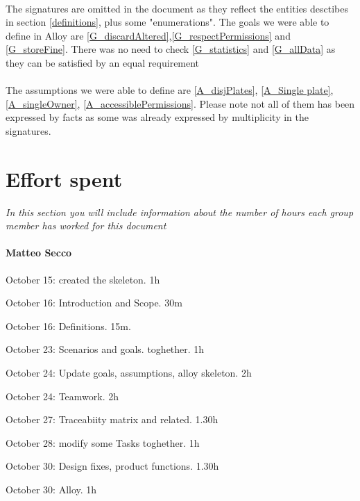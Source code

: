 \documentclass{article}
\begin{document}
	\paragraph{}The signatures are omitted in the document as they reflect the entities 				desctibes in section \ref{definitions}, plus some "enumerations". The goals we were able to define in Alloy are \ref{G_discardAltered},\ref{G_respectPermissions} and \ref{G_storeFine}.
	There was no need to check \ref{G_statistics} and \ref{G_allData} as they can be satisfied 	by an equal requirement
	\paragraph{}The assumptions we were able to define are \ref{A_disjPlates}, \ref{A_Single plate}, \ref{A_singleOwner}, \ref{A_accessiblePermissions}. Please note not all of them has been expressed by facts as some was already expressed by multiplicity in the signatures.
	
\section{Effort spent} \textit{In this section you will include information about the number of hours each group member has worked for this document}

	\paragraph{Matteo Secco} 
		\begin{list}{-}{}
			\item October 15: created the skeleton. 1h
			\item October 16: Introduction and Scope. 30m
			\item October 16: Definitions. 15m.
			\item October 23: Scenarios and goals. toghether. 1h
			\item October 24: Update goals, assumptions, alloy skeleton. 2h
			\item October 24: Teamwork. 2h
			\item October 27: Traceabiity matrix and related. 1.30h
			\item October 28: modify some Tasks toghether. 1h
			\item October 30: Design fixes, product functions. 1.30h
			\item October 30: Alloy. 1h
		\end{list}
		
\end{document}
